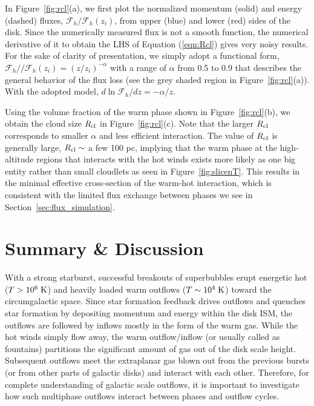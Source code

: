 \documentclass[twocolumn]{aastex62}
\newcommand\Kel{\;{\rm K}}
\begin{document}
In Figure~\ref{fig:rcl}(a), we first plot the normalized momentum (solid) and energy (dashed) fluxes, $\mathcal{F}_h/\mathcal{F}_h(z_i)$, from upper (blue) and lower (red) sides of the disk. Since the numerically measured flux is not a smooth function, the numerical derivative of it to obtain the LHS of Equation (\ref{eqn:Rcl}) gives very noisy results. For the sake of clarity of presentation, we simply adopt a functional form, $\mathcal{F}_h//\mathcal{F}_h(z_i)=(z/z_i)^{-\alpha}$ with a range of $\alpha$ from 0.5 to 0.9 that describes the general behavior of the flux loss (see the grey shaded region in Figure~\ref{fig:rcl}(a)). With the adopted model, $d\ln \mathcal{F}_h/dz=-\alpha/z$.

Using the volume fraction of the warm phase shown in Figure~\ref{fig:rcl}(b), we obtain the cloud size $R_{\rm cl}$ in Figure~\ref{fig:rcl}(c). Note that the larger $R_{\rm cl}$ corresponds to smaller $\alpha$ and less efficient interaction. The value of $R_{\rm cl}$ is generally large, $R_{\rm cl}\sim$ a few 100 pc, implying that the warm phase at the high-altitude regions that interacts with the hot winds exists more likely as one big entity rather than small cloudlets as seen in Figure~\ref{fig:slicenT}. This results in the minimal effective cross-section of the warm-hot interaction, which is consistent with the limited flux exchange between phases we see in Section~\ref{sec:flux_simulation}.



\section{Summary \& Discussion}\label{sec:summary}

With a strong starburst, successful breakouts of superbubbles erupt energetic hot ($T>10^6\Kel$) and heavily loaded warm outflows ($T\sim10^4\Kel$) toward the circumgalactic space. Since star formation feedback drives outflows and quenches star formation by depositing momentum and energy within the disk ISM, the outflows are followed by inflows mostly in the form of the warm gas. While the hot winds simply flow away, the warm outflow/inflow (or usually called as fountains) partitions the significant amount of gas out of the disk scale height. Subsequent outflows meet the extraplanar gas blown out from the previous bursts (or from other parts of galactic disks) and interact with each other. Therefore, for complete understanding of galactic scale outflows, it is important to investigate how such multiphase outflows interact between phases and outflow cycles.
\end{document}
